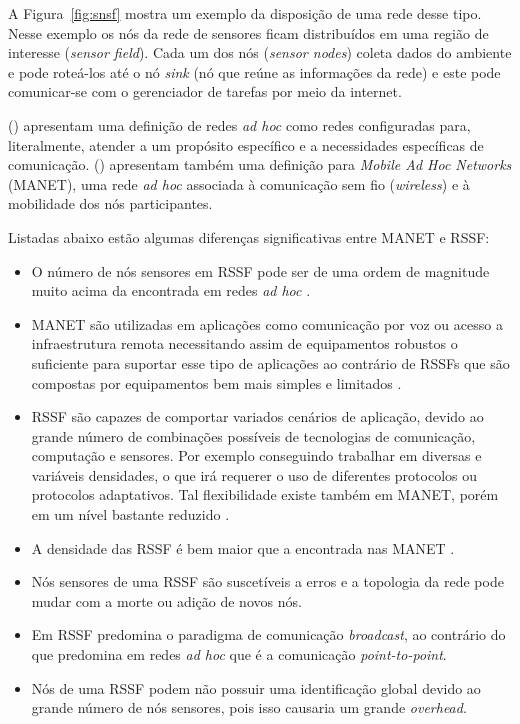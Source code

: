 A Figura~\ref{fig:snsf} mostra um exemplo da disposição de uma rede desse tipo. Nesse exemplo os nós da rede de sensores ficam distribuídos em uma região de interesse (\textit{sensor field}). Cada um dos nós (\textit{sensor nodes}) coleta dados do ambiente e pode roteá-los até o nó \textit{sink} (nó que reúne as informações da rede) e este pode comunicar-se com o gerenciador de tarefas por meio da internet.

 (\citeyear{Karl2005}) apresentam uma definição de redes \textit{ad hoc} como redes configuradas para, literalmente, atender a um propósito específico e a necessidades específicas de comunicação.  (\citeyear{Karl2005}) apresentam também uma definição para \textit{Mobile Ad Hoc Networks} (MANET), uma rede \textit{ad hoc} associada à comunicação sem fio (\textit{wireless}) e à mobilidade dos nós participantes. 


Listadas abaixo estão algumas diferenças significativas entre MANET e RSSF:
\begin{itemize} 
	\item O número de nós sensores em RSSF pode ser de uma ordem de magnitude muito acima da encontrada em redes \textit{ad hoc} \cite{Akyildiz2002}.
	\item MANET são utilizadas em aplicações como comunicação por voz ou acesso a infraestrutura remota necessitando assim de equipamentos robustos o suficiente para suportar esse tipo de aplicações ao contrário de RSSFs que são compostas por equipamentos bem mais simples e limitados \cite{Karl2005}. 
	\item RSSF são capazes de comportar variados cenários de aplicação, devido ao grande número de combinações possíveis de tecnologias de comunicação, computação e sensores. Por exemplo conseguindo trabalhar em diversas e variáveis densidades, o que irá requerer o uso de diferentes protocolos ou protocolos adaptativos. Tal flexibilidade existe também em MANET, porém em um nível bastante reduzido \cite{Karl2005}. 
	\item A densidade das RSSF é bem maior que a encontrada nas MANET \cite{Akyildiz2002}.
	\item Nós sensores de uma RSSF são suscetíveis a erros e a topologia da rede pode mudar com a morte ou adição de novos nós\cite{Akyildiz2002}. 
	\item Em RSSF predomina o paradigma de comunicação \textit{broadcast}, ao contrário do que predomina em redes \textit{ad hoc} que é a comunicação \textit{point-to-point}.
	\item Nós de uma RSSF podem não possuir uma identificação global devido ao grande número de nós sensores, pois isso causaria um grande \textit{overhead}.
\end{itemize} 


